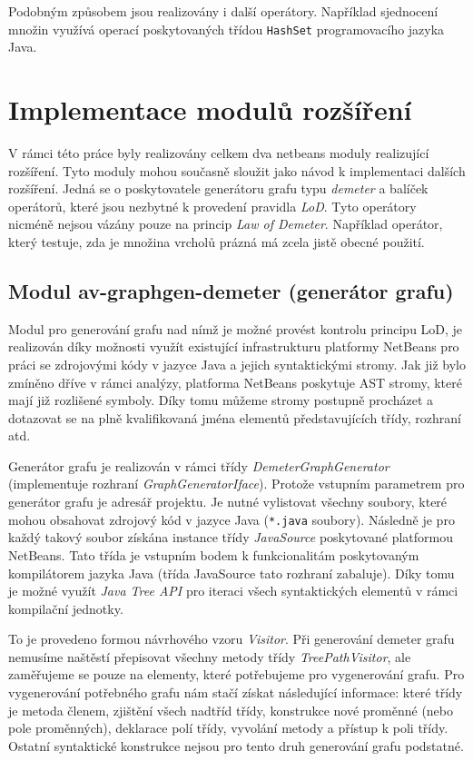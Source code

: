 Podobným způsobem jsou realizovány i další operátory. Například sjednocení množin využívá operací poskytovaných třídou \verb-HashSet- programovacího jazyka Java.

\section{Implementace modulů rozšíření}
V rámci této práce byly realizovány celkem dva netbeans moduly realizující rozšíření. Tyto moduly mohou současně sloužit jako návod k implementaci dalších rozšíření. Jedná se o poskytovatele generátoru grafu typu \emph{demeter} a balíček operátorů, které jsou nezbytné k provedení pravidla \emph{LoD}. Tyto operátory nicméně nejsou vázány pouze na princip \emph{Law of Demeter}. Například operátor, který testuje, zda je množina vrcholů prázná má zcela jistě obecné použití.

\subsection{Modul av-graphgen-demeter (generátor grafu)}
Modul pro generování grafu nad nímž je možné provést kontrolu principu LoD, je realizován díky možnosti využít existující infrastrukturu platformy NetBeans pro práci se zdrojovými kódy v jazyce Java a jejich syntaktickými stromy. Jak již bylo zmíněno dříve v rámci analýzy, platforma NetBeans poskytuje AST stromy, které mají již rozlišené symboly. Díky tomu můžeme stromy postupně procházet a dotazovat se na plně kvalifikovaná jména elementů představujících třídy, rozhraní atd.

Generátor grafu je realizován v rámci třídy \emph{DemeterGraphGenerator} (implementuje rozhraní \emph{GraphGeneratorIface}). Protože vstupním parametrem pro generátor grafu je  adresář projektu. Je nutné vylistovat všechny soubory, které mohou obsahovat zdrojový kód v jazyce Java (\verb+*.java+ soubory). Následně je pro každý takový soubor získána instance třídy \emph{JavaSource} poskytované platformou NetBeans. Tato třída je vstupním bodem k funkcionalitám poskytovaným kompilátorem jazyka Java (třída JavaSource tato rozhraní zabaluje). Díky tomu je možné využít \emph{Java Tree API} pro iteraci všech syntaktických elementů v rámci kompilační jednotky.

To je provedeno formou návrhového vzoru \emph{Visitor}. Při generování demeter grafu nemusíme naštěstí přepisovat všechny metody třídy \emph{TreePathVisitor}, ale zaměřujeme se pouze na elementy, které potřebujeme pro vygenerování grafu. Pro vygenerování potřebného grafu nám stačí získat následující informace: které třídy je metoda členem, zjištění všech nadtříd třídy, konstrukce nové proměnné (nebo pole proměnných), deklarace polí třídy, vyvolání metody a přístup k poli třídy. Ostatní syntaktické konstrukce nejsou pro tento druh generování grafu podstatné.

